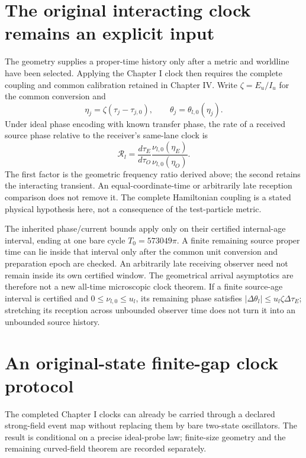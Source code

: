 \documentclass[10pt,twocolumn,letterpaper]{article}
\begin{document}
\section{The original interacting clock remains an explicit input}
The geometry supplies a proper-time history only after a metric and
worldline have been selected. Applying the Chapter I clock then
requires the complete coupling and common calibration retained in
Chapter IV. Write $\zeta=E_u/I_u$ for the common conversion and
\begin{equation}
 \eta_j=\zeta(\tau_j-\tau_{j,0}),\qquad
 \theta_j=\theta_{l,0}(\eta_j).
\end{equation}
Under ideal phase encoding with known transfer phase, the rate of a
received source phase relative to the receiver's same-lane clock is
\begin{equation}
 \mathcal R_l=
 \frac{d\tau_E}{d\tau_O}
 \frac{\nu_{l,0}(\eta_E)}{\nu_{l,0}(\eta_O)}.
 \label{eq:strong-actual-clock}
\end{equation}
The first factor is the geometric frequency ratio derived above; the
second retains the interacting transient. An equal-coordinate-time or
arbitrarily late reception comparison does not remove it. The complete
Hamiltonian coupling is a stated physical hypothesis here, not a
consequence of the test-particle metric.

The inherited phase/current bounds apply only on their certified
internal-age interval, ending at one bare cycle
$T_0=573049\pi$. A finite remaining source proper time can lie inside
that interval only after the common unit conversion and preparation
epoch are checked. An arbitrarily late receiving observer need not
remain inside its own certified window. The geometrical arrival
asymptotics are therefore not a new all-time microscopic clock theorem.
If a finite source-age interval is certified and
$0\leq\nu_{l,0}\leq u_l$, its remaining phase satisfies
$|\Delta\theta_l|\leq u_l\zeta\Delta\tau_E$; stretching its reception
across unbounded observer time does not turn it into an unbounded
source history.

\section{An original-state finite-gap clock protocol}
\label{sec:original-clock-protocol}
The completed Chapter I clocks can already be carried through a declared
strong-field event map without replacing them by bare two-state oscillators.
The result is conditional on a precise ideal-probe law; finite-size geometry
and the remaining curved-field theorem are recorded separately.
\end{document}
